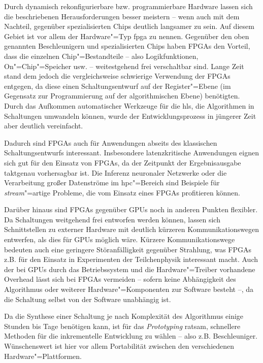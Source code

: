 Durch dynamisch rekonfigurierbare bzw. programmierbare Hardware lassen sich die
beschriebenen Herausforderungen besser meistern -- wenn auch mit dem Nachteil,
gegenüber spezialisierten Chips deutlich langsamer zu sein. Auf diesem Gebiet
ist vor allem der Hardware"=Typ \gls{fpga} zu nennen. Gegenüber den oben
genannten Beschleunigern und spezialisierten Chips haben FPGAs den Vorteil, dass
die einzelnen Chip"=Bestandteile -- also Logikfunktionen, On"=Chip"=Speicher
usw. -- weitestgehend frei verschaltbar sind. 
Lange Zeit stand dem jedoch die vergleichsweise schwierige Verwendung der
FPGAs entgegen, da diese einen Schaltungsentwurf auf der Register"=Ebene (im
Gegensatz zur Programmierung auf der algorithmischen Ebene) benötigten. Durch
das Aufkommen automatischer Werkzeuge für die \gls{hls}, die Algorithmen in
Schaltungen umwandeln können, wurde der Entwicklungsprozess in jüngerer Zeit
aber deutlich vereinfacht.

Dadurch sind FPGAs auch für Anwendungen abseits des klassischen
Schaltungsentwurfs interessant. Insbesondere latenzkritische Anwendungen eignen
sich gut für den Einsatz von FPGAs, da der Zeitpunkt der Ergebnisausgabe
taktgenau vorhersagbar ist. Die Inferenz neuronaler Netzwerke oder die
Verarbeitung großer Datenströme im \gls{hpc}"=Bereich sind Beispiele für
\textit{stream}"=artige Probleme, die vom Einsatz eines FPGAs profitieren
können.

Darüber hinaus sind FPGAs gegenüber GPUs noch in anderen Punkten flexibler. Da
Schaltungen weitgehend frei entworfen werden können, lassen sich Schnittstellen
zu externer Hardware mit deutlich kürzeren Kommunikationswegen entwerfen, als
dies für GPUs möglich wäre. Kürzere Kommunikationswege bedeuten auch eine
geringere Störanfälligkeit gegenüber Strahlung, was FPGAs z.B. für den Einsatz
in Experimenten der Teilchenphysik interessant macht. Auch der bei GPUs durch
das Betriebssystem und die Hardware"=Treiber vorhandene Overhead lässt sich bei
FPGAs vermeiden -- sofern keine Abhängigkeit des Algorithmus oder weiterer
Hardware"=Komponenten zur Software besteht --, da die Schaltung selbst von der
Software unabhängig ist.

Da die Synthese einer Schaltung je nach Komplexität des Algorithmus einige
Stunden bis Tage benötigen kann, ist für das \textit{Prototyping} ratsam,
schnellere Methoden für die inkrementelle Entwicklung zu wählen -- also z.B.
Beschleuniger. Wünschenswert ist hier vor allem Portabilität zwischen den
verschiedenen Hardware"=Plattformen.

